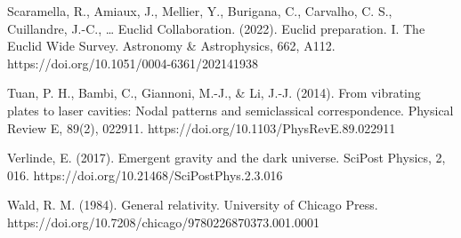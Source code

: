 \documentclass[11pt]{article}
\begin{document}
Scaramella, R., Amiaux, J., Mellier, Y., Burigana, C., Carvalho, C. S., Cuillandre, J.-C., \ldots{} Euclid Collaboration. (2022). Euclid preparation. I. The Euclid Wide Survey. Astronomy \& Astrophysics, 662, A112. https://doi.org/10.1051/0004-6361/202141938

Tuan, P. H., Bambi, C., Giannoni, M.-J., \& Li, J.-J. (2014). From vibrating plates to laser cavities: Nodal patterns and semiclassical correspondence. Physical Review E, 89(2), 022911. https://doi.org/10.1103/PhysRevE.89.022911

Verlinde, E. (2017). Emergent gravity and the dark universe. SciPost Physics, 2, 016. https://doi.org/10.21468/SciPostPhys.2.3.016

Wald, R. M. (1984). General relativity. University of Chicago Press. https://doi.org/10.7208/chicago/9780226870373.001.0001
\fi
\end{document}
